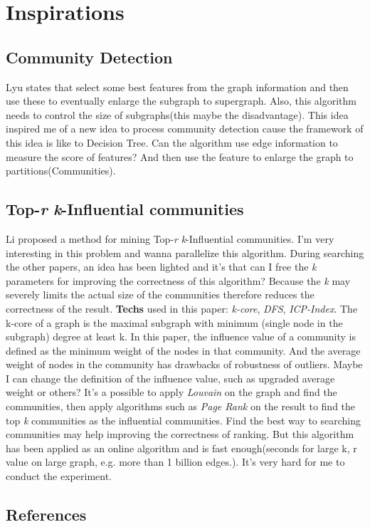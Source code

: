 \documentclass{article}
\begin{document}
	\section{Inspirations}
	\subsection{Community Detection}
	Lyu\cite{lyu2016scalable} states that select some best features from the graph information and then use these to eventually enlarge the subgraph to supergraph. 
	\newline
	Also, this algorithm needs to control the size of subgraphs(this maybe the disadvantage).
	\newline
	This idea inspired me of a new idea to process community detection cause the framework of this idea is like to Decision Tree. Can the algorithm use edge information to measure the score of features? And then use the feature to enlarge the graph to partitions(Communities).
	\subsection{Top-\emph{r} \emph{k}-Influential communities}
	Li\cite{li2015influential} proposed a method for mining Top-\emph{r} \emph{k}-Influential communities. I'm very interesting in this problem and wanna parallelize this algorithm. During searching the other papers, an idea has been lighted and it's that can I free the \emph{k} parameters for improving the correctness of this algorithm? Because the \emph{k} may severely limits the actual size of the communities therefore reduces the correctness of the result.
	\newline
	\textbf{Techs} used in this paper: \emph{k-core}, \emph{DFS}, \emph{ICP-Index}.
	\newline
	The k-core of a graph is the maximal subgraph with minimum (single node in the subgraph) degree at least k.
	\newline
	In this paper, the influence value of a community is defined as the minimum weight of the nodes in that community. And the average weight of nodes in the community has drawbacks of robustness of outliers. Maybe I can change the definition of the influence value, such as upgraded average weight or others?
	\newline
	It's a possible to apply \emph{Louvain} on the graph and find the communities, then apply algorithms such as \emph{Page Rank} on the result to find the top \emph{k} communities as the influential communities.
	\newline
	Find the best way to searching communities may help improving the correctness of ranking.
	\newline
	But this algorithm has been applied as an online algorithm and is fast enough(seconds for large k, r value on large graph, e.g. more than 1 billion edges.). It's very hard for me to conduct the experiment.

	\begin{appendix}
		\section{References}
		
		
	\end{appendix}
\end{document}
